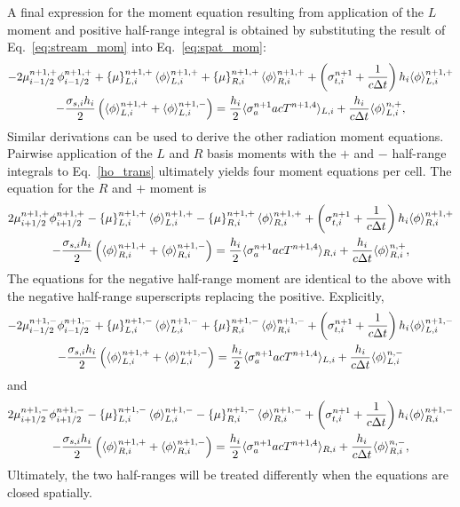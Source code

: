 A final expression for the moment equation resulting from application of the $L$ moment and
positive half-range integral is obtained by substituting the result of
Eq.~\eqref{eq:stream_mom} into Eq.~\eqref{eq:spat_mom}:
\begin{multline}\label{eq:exact_lmomp}
    -2{\mu}_{i-1/2}^{n+1,+} \phi_{i-1/2}^{n+1,+} + \left\{ \mu \right\}_{L,i}^{n+1,+}
  \langle \phi \rangle_{L,i}^{n+1,+}
  +  \left\{ \mu \right\}_{R,i}^{n+1,+}
  \langle \phi \rangle_{R,i}^{n+1,+} +  \left(\sigma_{t,i}^{n+1}+\frac{1}{c \Delta t} \right) h_i 
  \langle \phi \rangle_{L,i}^{n+1,+} \\-  \frac{\sigma_{s,i} h_i}{2} \left( \langle \phi \rangle_{L,i}^{n+1,+} +
  \langle \phi \rangle_{L,i}^{n+1,-}\right) = \frac{h_i}{2} \langle \sigma_a^{n+1} a c T^{n+1,4} \rangle_{L,i} +
  \frac{h_i}{c\Delta t}\langle \phi \rangle_{L,i}^{n,+},
\end{multline}
Similar derivations can be used to derive the other radiation moment equations.  
Pairwise application of the $L$ and $R$ basis
moments with the $+$ and $-$ half-range integrals to Eq.~\eqref{ho_trans} 
ultimately yields four moment
equations per cell.  The equation for the $R$ and $+$ moment is
\begin{multline}\label{eq:exact_rmomp}
    2{\mu}_{i+1/2}^{n+1,+} \phi_{i+1/2}^{n+1,+} - \left\{ \mu \right\}_{L,i}^{n+1,+}
  \langle \phi \rangle_{L,i}^{n+1,+}
  -  \left\{ \mu \right\}_{R,i}^{n+1,+}
  \langle \phi \rangle_{R,i}^{n+1,+} +  \left(\sigma_{t,i}^{n+1}+\frac{1}{c \Delta t} \right) h_i 
  \langle \phi \rangle_{R,i}^{n+1,+} \\-  \frac{\sigma_{s,i} h_i}{2} \left( \langle \phi \rangle_{R,i}^{n+1,+} +
  \langle \phi \rangle_{R,i}^{n+1,-}\right) = \frac{h_i}{2} \langle \sigma_a^{n+1} a c T^{n+1,4} \rangle_{R,i} +
  \frac{h_i}{c\Delta t}\langle \phi \rangle_{R,i}^{n,+},
\end{multline}
The equations for the negative half-range moment are identical to the above with the
negative half-range superscripts replacing the positive.  Explicitly,
\begin{multline}\label{eq:exact_lmomm}
    -2{\mu}_{i-1/2}^{n+1,-} \phi_{i-1/2}^{n+1,-} + \left\{ \mu \right\}_{L,i}^{n+1,-}
  \langle \phi \rangle_{L,i}^{n+1,-}
  +  \left\{ \mu \right\}_{R,i}^{n+1,-}
  \langle \phi \rangle_{R,i}^{n+1,-} +  \left(\sigma_{t,i}^{n+1}+\frac{1}{c \Delta t} \right) h_i 
  \langle \phi \rangle_{L,i}^{n+1,-} \\-  \frac{\sigma_{s,i} h_i}{2} \left( \langle \phi \rangle_{L,i}^{n+1,+} +
  \langle \phi \rangle_{L,i}^{n+1,-}\right) = \frac{h_i}{2} \langle \sigma_a^{n+1} a c T^{n+1,4} \rangle_{L,i} +
  \frac{h_i}{c\Delta t}\langle \phi \rangle_{L,i}^{n,-}
\end{multline}
and
\begin{multline}\label{eq:exact_rmomm}
    2{\mu}_{i+1/2}^{n+1,-} \phi_{i+1/2}^{n+1,-} - \left\{ \mu \right\}_{L,i}^{n+1,-}
  \langle \phi \rangle_{L,i}^{n+1,-}
  -  \left\{ \mu \right\}_{R,i}^{n+1,-}
  \langle \phi \rangle_{R,i}^{n+1,-} +  \left(\sigma_{t,i}^{n+1}+\frac{1}{c \Delta t} \right) h_i 
  \langle \phi \rangle_{R,i}^{n+1,-} \\-  \frac{\sigma_{s,i} h_i}{2} \left( \langle \phi \rangle_{R,i}^{n+1,+} +
  \langle \phi \rangle_{R,i}^{n+1,-}\right) = \frac{h_i}{2} \langle \sigma_a^{n+1} a c T^{n+1,4} \rangle_{R,i} +
  \frac{h_i}{c\Delta t}\langle \phi \rangle_{R,i}^{n,-},
\end{multline}
Ultimately, the two half-ranges will be treated differently when the equations are closed
spatially.

